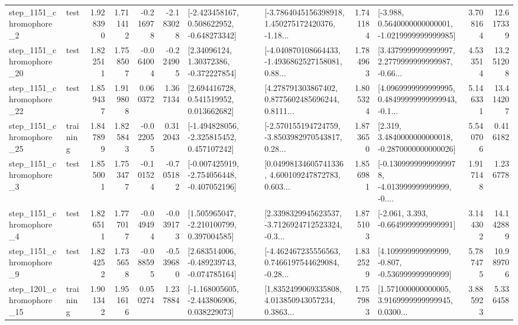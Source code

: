 \begin{tabular}{llrrrrllrlrr}
  step\_1151\_chromophore\_2 &      test &      1.928390 &    1.711412 &     -0.216978 & -2.183028 &   [-2.423458167, 0.508622952, -0.648273342] &  [-3.7864045156398918, 1.450275172420376, -1.18... &       1.741184 &  [-3.988, 0.5640000000000001, -1.0219999999999985] &            3.708164 &         12.617339 \\
 step\_1151\_chromophore\_20 &      test &      1.822511 &    1.758507 &     -0.064004 & -0.224905 &      [2.34096124, 1.30372386, -0.372227854] &  [-4.040870108664433, -1.4936862527158081, 0.88... &       1.784963 &  [3.4379999999999997, 2.2779999999999987, -0.66... &            4.533514 &         13.251208 \\
 step\_1151\_chromophore\_22 &      test &      1.859437 &    1.919808 &      0.060372 &  1.367134 &     [2.694416728, 0.541519952, 0.013662682] &  [4.278791303867402, 0.8775602485696244, 0.8111... &       1.805324 &  [4.0969999999999995, 0.48499999999999943, -0.1... &            5.146331 &         13.414207 \\
 step\_1151\_chromophore\_25 &  training &      1.847899 &    1.825843 &     -0.022055 &  0.312043 &   [-1.494828056, -2.325815452, 0.457107242] &  [-2.570155194724759, -3.8503982970543817, 0.28... &       1.873650 &   [2.319, 3.4840000000000018, -0.2870000000000026] &            5.540706 &          0.416182 \\
  step\_1151\_chromophore\_3 &      test &      1.855001 &    1.753477 &     -0.101524 & -0.705182 &  [-0.007425919, -2.754056448, -0.407052196] &  [0.04998134605741336, 4.600109247872783, 0.603... &       1.856981 &  [-0.13099999999999978, -4.013999999999999, -0.... &            1.917148 &          1.236778 \\
  step\_1151\_chromophore\_4 &      test &      1.826511 &    1.777017 &     -0.049494 & -0.039173 &    [1.505965047, -2.210100799, 0.397004585] &  [2.3398329945623537, -3.7126924712523324, -0.3... &       1.875103 &               [-2.061, 3.393, -0.6649999999999991] &            3.144302 &         14.142889 \\
  step\_1151\_chromophore\_9 &      test &      1.824252 &    1.735658 &     -0.088595 & -0.539680 &   [2.683514006, -0.489239743, -0.074785164] &  [-4.462467235556563, 0.7466197544629084, -0.28... &       1.832529 &    [4.109999999999999, -0.807, -0.536999999999999] &            5.787475 &         10.989706 \\
 step\_1201\_chromophore\_15 &  training &      1.901342 &    1.951616 &      0.050274 &  1.237884 &   [-1.168005605, -2.443806906, 0.038229073] &  [1.8352499069335808, 4.013850943057234, 0.3863... &       1.757983 &  [1.571000000000005, 3.9169999999999945, 0.0300... &            3.885923 &          5.336458 \\

\end{tabular}
